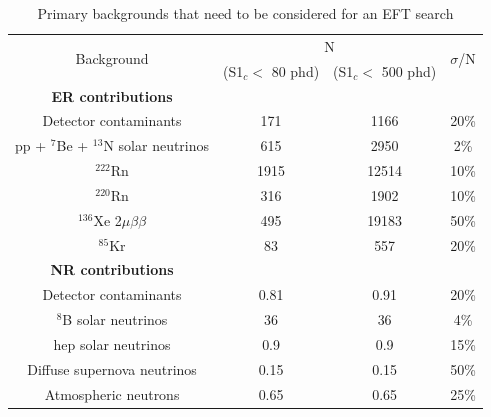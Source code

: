 \begin{table}[]
    \centering
    \begin{tabular}{c|c|c|c}
        \multirow{2}{*}{Background}                  & \multicolumn{2}{|c|}{N}                          & \multirow{2}{*}{$\sigma$/N}  \\ 
                                                     &  (S1$_c <$ 80 phd)     & (S1$_c <$ 500 phd)      &              \\ \hline
        \textbf{ER contributions}                    &                        &                         &   \\
        Detector contaminants                        & 171                    & 1166                    & 20\% \cite{LZ_projected_sensitivity_paper_ref}        \\
        pp + ${}^{7}$Be + ${}^{13}$N solar neutrinos & 615                    & 2950                    & 2\% \cite{pp_solar_neutrinos_rate_ref}       \\
        ${}^{222}$Rn                                 & 1915                   & 12514                   & 10\% \cite{lz_predicted_radon_rate_ref}        \\
        ${}^{220}$Rn                                 & 316                    & 1902                    & 10\% \cite{lz_predicted_radon_rate_ref}        \\
        ${}^{136}$Xe 2$\mu\beta\beta$                & 495                    & 19183                   & 50\% \cite{double_beta_decay_rate_ref}        \\
        ${}^{85}$Kr                                  & 83                     & 557                     & 20\% \cite{kr85_rate_ref}         \\ \hline
        \textbf{NR contributions}                    &                        &                         &   \\
        Detector contaminants                        & 0.81                   & 0.91                    & 20\% \cite{LZ_projected_sensitivity_paper_ref}         \\
        ${}^{8}$B solar neutrinos                    & 36                     & 36                      & 4\%  \cite{b8_neutrino_rate_ref}       \\
        hep solar neutrinos                          & 0.9                    & 0.9                     & 15\% \cite{pp_solar_neutrinos_rate_ref}        \\
        Diffuse supernova neutrinos                  & 0.15                   & 0.15                    & 50\% \cite{dissuse_supernova_neutrinos_rate_ref}        \\
        Atmospheric neutrons                         & 0.65                   & 0.65                    & 25\% \cite{atmospheric_neutrinos_rate_ref}      
    \end{tabular}
    \caption{Primary backgrounds that need to be considered for an EFT search}
    \label{tab:projected_lz_backgrounds}
\end{table}
